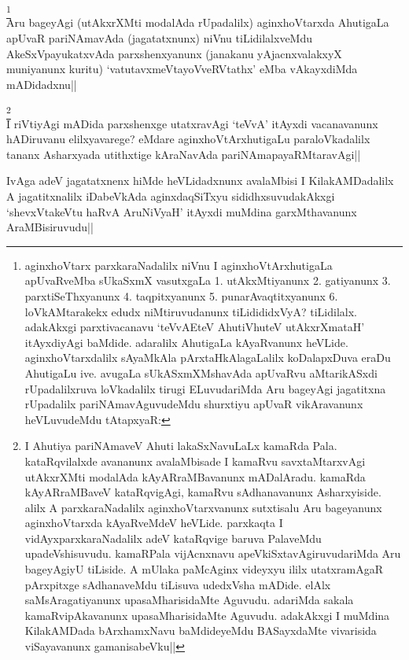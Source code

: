 \begin{artha}
\footnote[1]{aginxhoVtarx parxkaraNadalilx niVnu I 
aginxhoVtArxhutigaLa apUvaRveMba sUkaSxmX vasutxgaLa 1. utAkxMtiyanunx 
2. gatiyanunx 3. parxtiSeThxyanunx 4. taqpitxyanunx 5. 
punarAvaqtitxyanunx 6. loVkAMtarakekx edudx niMtiruvudanunx 
tiLidididxVyA? tiLidilalx. adakAkxgi parxtivacanavu `teVvAEteV 
AhutiVhuteV utAkxrXmataH' itAyxdiyAgi baMdide. adaralilx AhutigaLa 
kAyaRvanunx heVLide. aginxhoVtarxdalilx sAyaMkAla pArxtaHkAlagaLalilx 
koDalapxDuva eraDu AhutigaLu ive. avugaLa sUkASxmXMshavAda apUvaRvu 
aMtarikASxdi rUpadalilxruva loVkadalilx tirugi ELuvudariMda Aru 
bageyAgi jagatitxna rUpadalilx pariNAmavAguvudeMdu shurxtiyu apUvaR 
vikAravanunx heVLuvudeMdu tAtapxyaR:}\\
Aru bageyAgi (utAkxrXMti modalAda rUpadalilx) aginxhoVtarxda AhutigaLa 
apUvaR pariNAmavAda (jagatatxnunx) niVnu tiLidilalxveMdu 
AkeSxVpayukatxvAda parxshenxyanunx (janakanu yAjacnxvalakxyX 
muniyanunx kuritu) `vatutavxmeVtayoVveRVtathx' eMba vAkayxdiMda 
mADidadxnu||
\end{artha}

\begin{artha}
\footnote[2]{I Ahutiya pariNAmaveV Ahuti lakaSxNavuLaLx kamaRda Pala. 
kataRqvilalxde avananunx avalaMbisade I kamaRvu savxtaMtarxvAgi 
utAkxrXMti modalAda kAyARraMBavanunx mADalAradu. kamaRda kAyARraMBaveV 
kataRqvigAgi, kamaRvu sAdhanavanunx Asharxyiside. alilx A 
parxkaraNadalilx aginxhoVtarxvanunx sutxtisalu Aru bageyanunx 
aginxhoVtarxda kAyaRveMdeV heVLide. parxkaqta I vidAyxparxkaraNadalilx 
adeV kataRqvige baruva PalaveMdu upadeVshisuvudu. kamaRPala 
vijAcnxnavu apeVkiSxtavAgiruvudariMda Aru bageyAgiyU tiLiside. A 
mUlaka paMcAginx videyxyu ililx utatxramAgaR pArxpitxge sAdhanaveMdu 
tiLisuva udedxVsha mADide. elAlx saMsAragatiyanunx upasaMharisidaMte 
Aguvudu. adariMda sakala kamaRvipAkavanunx upasaMharisidaMte Aguvudu. 
adakAkxgi I muMdina KilakAMDada bArxhamxNavu baMdideyeMdu BASayxdaMte 
vivarisida viSayavanunx gamanisabeVku||}\\
I riVtiyAgi mADida parxshenxge utatxravAgi `teVvA' itAyxdi 
vacanavanunx hADiruvanu elilxyavarege? eMdare aginxhoVtArxhutigaLu 
paraloVkadalilx tananx Asharxyada utithxtige kAraNavAda 
pariNAmapayaRMtaravAgi||
\end{artha}

\begin{artha}
IvAga adeV jagatatxnenx hiMde heVLidadxnunx avalaMbisi I 
KilakAMDadalilx A jagatitxnalilx iDabeVkAda aginxdaqSiTxyu 
sididhxsuvudakAkxgi `shevxVtakeVtu haRvA AruNiVyaH' itAyxdi muMdina 
garxMthavanunx AraMBisiruvudu||
\end{artha}

